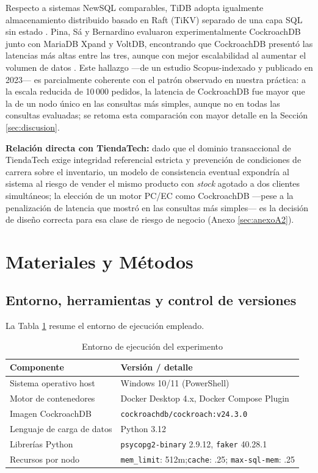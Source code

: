 \documentclass[10pt,letterpaper]{article}
\begin{document}
Respecto a sistemas NewSQL comparables, TiDB adopta igualmente almacenamiento distribuido basado en Raft (TiKV) separado de una capa SQL sin estado \citep{huang2020tidb}. Pina, Sá y Bernardino evaluaron experimentalmente CockroachDB junto con MariaDB Xpand y VoltDB, encontrando que CockroachDB presentó las latencias más altas entre las tres, aunque con mejor escalabilidad al aumentar el volumen de datos \citep{pina2023newsql}. Este hallazgo —de un estudio Scopus-indexado y publicado en 2023— es parcialmente coherente con el patrón observado en nuestra práctica: a la escala reducida de 10\,000 pedidos, la latencia de CockroachDB fue mayor que la de un nodo único en las consultas más simples, aunque no en todas las consultas evaluadas; se retoma esta comparación con mayor detalle en la Sección \ref{sec:discusion}.

\textbf{Relación directa con TiendaTech:} dado que el dominio transaccional de TiendaTech exige integridad referencial estricta y prevención de condiciones de carrera sobre el inventario, un modelo de consistencia eventual expondría al sistema al riesgo de vender el mismo producto con \textit{stock} agotado a dos clientes simultáneos; la elección de un motor PC/EC como CockroachDB —pese a la penalización de latencia que mostró en las consultas más simples— es la decisión de diseño correcta para esa clase de riesgo de negocio (Anexo \ref{sec:anexoA2}).

\section{Materiales y Métodos}

\subsection{Entorno, herramientas y control de versiones}
La Tabla \ref{tab:materiales} resume el entorno de ejecución empleado.

\begin{table}[H]
\centering
\caption{Entorno de ejecución del experimento}
\label{tab:materiales}
\begin{tabularx}{\columnwidth}{lX}
\toprule
\textbf{Componente} & \textbf{Versión / detalle}\\
\midrule
Sistema operativo host & Windows 10/11 (PowerShell) \\
Motor de contenedores & Docker Desktop 4.x, Docker Compose Plugin \\
Imagen CockroachDB & \texttt{cockroachdb/\allowbreak cockroach:v24.3.0} \\
Lenguaje de carga de datos & Python 3.12 \\
Librerías Python & \texttt{psycopg2-binary} 2.9.12, \texttt{faker} 40.28.1 \\
Recursos por nodo & \texttt{mem\_limit}: 512m;\newline \texttt{cache}: .25; \texttt{max-sql-mem}: .25 \\
\bottomrule
\end{tabularx}
\end{table}
\end{document}
